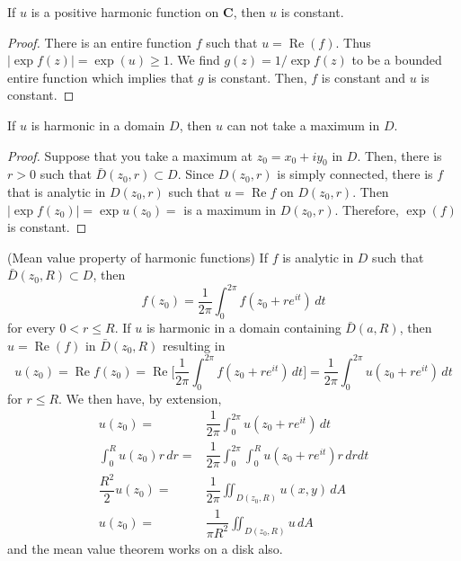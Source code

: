 \begin{thm}
If $u$ is a positive harmonic function on ${\bm C}$, then $u$ is constant. 
\end{thm}
\vspace{2ex}
\begin{proof}
There is an entire function $f$ such that $u=\mathop{\mathrm{Re}}(f)$. Thus $|\exp f(z)|=\exp (u)\geq 1$. We find $g(z)=1/\exp f(z)$ to be a bounded entire function which implies that $g$ is constant. Then, $f$ is constant and $u$ is constant.
\end{proof}
\vspace{2ex}
\begin{thm}
If $u$ is harmonic in a domain $D$, then $u$ can not take a maximum in $D$. 
\end{thm}
\vspace{2ex}
\begin{proof}
Suppose that you take a maximum at $z_0=x_0+iy_0$ in $D$. Then, there is $r>0$ such that $\bar{D}(z_0,r)\subset D$. Since $D(z_0,r)$ is simply connected, there is $f$ that is analytic in $D(z_0,r)$ such that $u=\mathop{\mathrm{Re}}f$ on $D(z_0,r)$. Then $|\exp f(z_0)|=\exp u(z_0)=$ is a maximum in $D(z_0,r)$. Therefore, $\exp (f)$ is constant. 
\end{proof}
\vspace{2ex}
\begin{thm}
(Mean value property of harmonic functions) If $f$ is analytic in $D$ such that $\bar{D}(z_0,R)\subset D$, then 
\[f(z_0)=\dfrac{1}{2\pi }\int ^{2\pi }_{0}f(z_0+re^{it})\,dt\]
for every $0<r\leq R$. If $u$ is harmonic in a domain containing $\bar{D}(a,R)$, then $u=\mathop{\mathrm{Re}}(f)$ in $\bar{D}(z_0,R)$ resulting in
\[u(z_0)=\mathop{\mathrm{Re}}f(z_0)=\mathop{\mathrm{Re}}\Big[\dfrac{1}{2\pi }\int ^{2\pi }_{0}f(z_0+re^{it})\,dt\Big]=\dfrac{1}{2\pi }\int ^{2\pi }_{0}u(z_0+re^{it})\,dt \]
for $r\leq R$. We then have, by extension,
\begin{align*}
u(z_0)=&\dfrac{1}{2\pi }\int ^{2\pi }_{0}u(z_0+re^{it})\,dt\\
\int ^{R}_{0}u(z_0)r\,dr=&\dfrac{1}{2\pi }\int ^{2\pi }_{0}\int^{R}_{0}u(z_0+re^{it})r\,drdt\\
\dfrac{R^2}{2}u(z_0)=&\dfrac{1}{2\pi }\iint _{D(z_0,R)}u(x,y)\,dA\\
u(z_0)=&\dfrac{1}{\pi R^2}\iint _{D(z_0,R)}u\,dA
\end{align*}
and the mean value theorem works on a disk also.
\end{thm}
\vspace{2ex}
